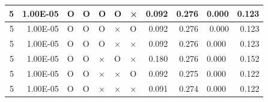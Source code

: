 \documentclass[11pt]{article}
\begin{document}
\begin{longtable}[h]{|r|r|l|l|l|l|l|r|r|l|r|}
5                                 & 1.00E-05                         & O                                & O                                & O                                & O                                & ×                                 & 0.092                             & 0.276                             & \multicolumn{1}{r|}{0.000}         & 0.123                               \\ \hline
5                                 & 1.00E-05                         & O                                & O                                & O                                & ×                                & O                                 & 0.092                             & 0.276                             & \multicolumn{1}{r|}{0.000}         & 0.123                               \\ \hline
5                                 & 1.00E-05                         & O                                & O                                & O                                & ×                                & ×                                 & 0.092                             & 0.276                             & 0.000                              & 0.123                               \\ \hline
5                                 & 1.00E-05                         & O                                & O                                & ×                                & O                                & ×                                 & 0.180                             & 0.276                             & 0.000                              & 0.152                               \\ \hline
5                                 & 1.00E-05                         & O                                & O                                & ×                                & ×                                & O                                 & 0.092                             & 0.275                             & 0.000                              & 0.122                               \\ \hline
5                                 & 1.00E-05                         & O                                & O                                & ×                                & ×                                & ×                                 & 0.091                             & 0.274                             & 0.000                              & 0.122                               \\ \hline

\end{longtable}
\end{document}

